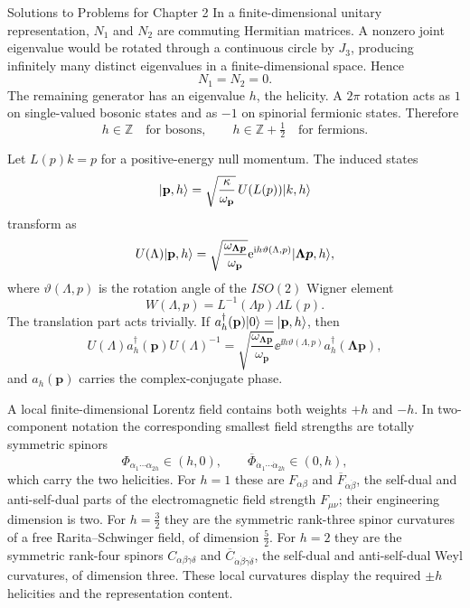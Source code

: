 \begin{bankssolutions}{Solutions to Problems for Chapter 2}
In a finite-dimensional unitary representation, $N_{1}$ and $N_{2}$ are commuting Hermitian matrices. A nonzero joint eigenvalue would be rotated through a continuous circle by $J_{3}$, producing infinitely many distinct eigenvalues in a finite-dimensional space. Hence
\[
  N_{1}=N_{2}=0.
\]
The remaining generator has an eigenvalue $h$, the helicity. A $2\pi$ rotation acts as $1$ on single-valued bosonic states and as $-1$ on spinorial fermionic states. Therefore
\[
  h\in\mathbb Z\quad\text{for bosons},
  \qquad
  h\in\mathbb Z+\tfrac12\quad\text{for fermions}.
\]

Let $L(p)k=p$ for a positive-energy null momentum. The induced states
\[
  \lvert \mathbf p,h\rangle=\sqrt{\frac{\kappa}{\omega_{\mathbf p}}}\,U(L(p))\lvert k,h\rangle
\]
transform as
\[
  U(\Lambda)\lvert \mathbf p,h\rangle
  =\sqrt{\frac{\omega_{\boldsymbol{\Lambda p}}}{\omega_{\mathbf p}}}
   \mathrm{e}^{\mathrm{i} h\vartheta(\Lambda,p)}\lvert \boldsymbol{\Lambda p},h\rangle,
\]
where $\vartheta(\Lambda,p)$ is the rotation angle of the $ISO(2)$ Wigner element
\[
  W(\Lambda,p)=L^{-1}(\Lambda p)\Lambda L(p).
\]
The translation part acts trivially. If $a_{h}^{\dagger}(\mathbf p)\lvert 0\rangle=\lvert \mathbf p,h\rangle$, then
\[
  U(\Lambda)a_{h}^{\dagger}(\mathbf p)U(\Lambda)^{-1}
  =\sqrt{\frac{\omega_{\boldsymbol{\Lambda p}}}{\omega_{\mathbf p}}}
   \ee^{\ii h\vartheta(\Lambda,p)}a_{h}^{\dagger}(\boldsymbol{\Lambda p}),
\]
and $a_{h}(\mathbf p)$ carries the complex-conjugate phase.

A local finite-dimensional Lorentz field contains both weights $+h$ and $-h$. In two-component notation the corresponding smallest field strengths are totally symmetric spinors
\[
  \Phi_{\alpha_{1}\cdots\alpha_{2h}}\in(h,0),
  \qquad
  \overline\Phi_{\dot\alpha_{1}\cdots\dot\alpha_{2h}}\in(0,h),
\]
which carry the two helicities. For $h=1$ these are $F_{\alpha\beta}$ and $\overline F_{\dot\alpha\dot\beta}$, the self-dual and anti-self-dual parts of the electromagnetic field strength $F_{\mu\nu}$; their engineering dimension is two. For $h=\tfrac32$ they are the symmetric rank-three spinor curvatures of a free Rarita--Schwinger field, of dimension $\tfrac52$. For $h=2$ they are the symmetric rank-four spinors $C_{\alpha\beta\gamma\delta}$ and $\overline C_{\dot\alpha\dot\beta\dot\gamma\dot\delta}$, the self-dual and anti-self-dual Weyl curvatures, of dimension three. These local curvatures display the required $\pm h$ helicities and the representation content.


\end{bankssolutions}

